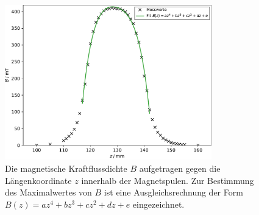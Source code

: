 \clearpage
\begin{figure}[H]
  \centering
  \includegraphics[width=0.8\textwidth]{plots/hall.pdf}
  \caption{Die magnetische Kraftflussdichte $B$ aufgetragen gegen die Längenkoordinate $z$ innerhalb der Magnetspulen. Zur Bestimmung des Maximalwertes von $B$ ist eine Ausgleichsrechnung der Form $B(z)=az^4+bz^3+cz^2+dz+e$ eingezeichnet.}
  \label{hall}
\end{figure}

